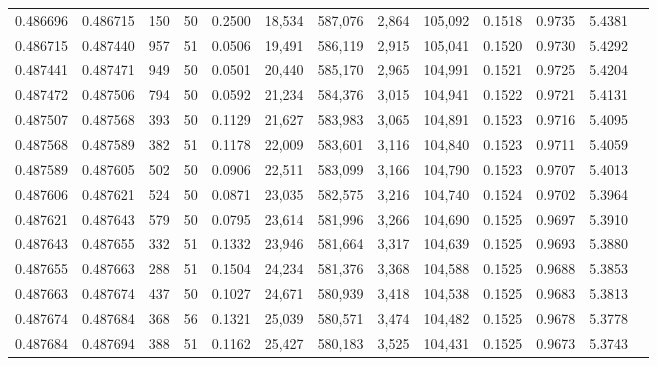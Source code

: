 \begin{tabular}{rrrrrrrrrrrrr}
0.486696 & 0.486715 & 150 &  50 &                                     0.2500 &  18,534 & 587,076 &   2,864 & 105,092 & 0.1518 & 0.9735 & 5.4381 \\
0.486715 & 0.487440 & 957 &  51 &                                     0.0506 &  19,491 & 586,119 &   2,915 & 105,041 & 0.1520 & 0.9730 & 5.4292 \\
0.487441 & 0.487471 & 949 &  50 &                                     0.0501 &  20,440 & 585,170 &   2,965 & 104,991 & 0.1521 & 0.9725 & 5.4204 \\
0.487472 & 0.487506 & 794 &  50 &                                     0.0592 &  21,234 & 584,376 &   3,015 & 104,941 & 0.1522 & 0.9721 & 5.4131 \\
0.487507 & 0.487568 & 393 &  50 &                                     0.1129 &  21,627 & 583,983 &   3,065 & 104,891 & 0.1523 & 0.9716 & 5.4095 \\
0.487568 & 0.487589 & 382 &  51 &                                     0.1178 &  22,009 & 583,601 &   3,116 & 104,840 & 0.1523 & 0.9711 & 5.4059 \\
0.487589 & 0.487605 & 502 &  50 &                                     0.0906 &  22,511 & 583,099 &   3,166 & 104,790 & 0.1523 & 0.9707 & 5.4013 \\
0.487606 & 0.487621 & 524 &  50 &                                     0.0871 &  23,035 & 582,575 &   3,216 & 104,740 & 0.1524 & 0.9702 & 5.3964 \\
0.487621 & 0.487643 & 579 &  50 &                                     0.0795 &  23,614 & 581,996 &   3,266 & 104,690 & 0.1525 & 0.9697 & 5.3910 \\
0.487643 & 0.487655 & 332 &  51 &                                     0.1332 &  23,946 & 581,664 &   3,317 & 104,639 & 0.1525 & 0.9693 & 5.3880 \\
0.487655 & 0.487663 & 288 &  51 &                                     0.1504 &  24,234 & 581,376 &   3,368 & 104,588 & 0.1525 & 0.9688 & 5.3853 \\
0.487663 & 0.487674 & 437 &  50 &                                     0.1027 &  24,671 & 580,939 &   3,418 & 104,538 & 0.1525 & 0.9683 & 5.3813 \\
0.487674 & 0.487684 & 368 &  56 &                                     0.1321 &  25,039 & 580,571 &   3,474 & 104,482 & 0.1525 & 0.9678 & 5.3778 \\
0.487684 & 0.487694 & 388 &  51 &                                     0.1162 &  25,427 & 580,183 &   3,525 & 104,431 & 0.1525 & 0.9673 & 5.3743 \\

\end{tabular}
